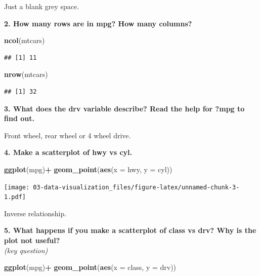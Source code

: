 \documentclass[]{book}
\newenvironment{Shaded}{\begin{snugshade}}{\end{snugshade}}
\newcommand{\DataTypeTok}[1]{\textcolor[rgb]{0.13,0.29,0.53}{#1}}
\newcommand{\KeywordTok}[1]{\textcolor[rgb]{0.13,0.29,0.53}{\textbf{#1}}}
\newcommand{\NormalTok}[1]{#1}
\newcommand{\OperatorTok}[1]{\textcolor[rgb]{0.81,0.36,0.00}{\textbf{#1}}}
\newcommand{\StringTok}[1]{\textcolor[rgb]{0.31,0.60,0.02}{#1}}
\theoremstyle{definition}
\theoremstyle{definition}
\theoremstyle{definition}
\theoremstyle{remark}
\begin{document}
Just a blank grey space.

\textbf{2. How many rows are in mpg? How many columns?}

\begin{Shaded}
\begin{Highlighting}[]
\KeywordTok{ncol}\NormalTok{(mtcars)}
\end{Highlighting}
\end{Shaded}

\begin{verbatim}
## [1] 11
\end{verbatim}

\begin{Shaded}
\begin{Highlighting}[]
\KeywordTok{nrow}\NormalTok{(mtcars)}
\end{Highlighting}
\end{Shaded}

\begin{verbatim}
## [1] 32
\end{verbatim}

\textbf{3. What does the drv variable describe? Read the help for ?mpg
to find out.}

Front wheel, rear wheel or 4 wheel drive.

\textbf{4. Make a scatterplot of hwy vs cyl.}

\begin{Shaded}
\begin{Highlighting}[]
\KeywordTok{ggplot}\NormalTok{(mpg)}\OperatorTok{+}
\StringTok{  }\KeywordTok{geom_point}\NormalTok{(}\KeywordTok{aes}\NormalTok{(}\DataTypeTok{x =}\NormalTok{ hwy, }\DataTypeTok{y =}\NormalTok{ cyl))}
\end{Highlighting}
\end{Shaded}

\texttt{[image: 03-data-visualization\_files/figure-latex/unnamed-chunk-3-1.pdf]}

Inverse relationship.

\textbf{5. What happens if you make a scatterplot of class vs drv? Why
is the plot not useful?}\\
\emph{(key question)}

\begin{Shaded}
\begin{Highlighting}[]
\KeywordTok{ggplot}\NormalTok{(mpg)}\OperatorTok{+}
\StringTok{  }\KeywordTok{geom_point}\NormalTok{(}\KeywordTok{aes}\NormalTok{(}\DataTypeTok{x =}\NormalTok{ class, }\DataTypeTok{y =}\NormalTok{ drv))}
\end{Highlighting}
\end{Shaded}
\end{document}
